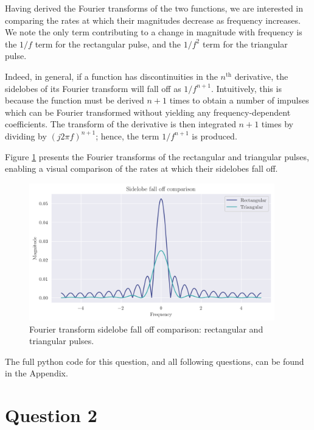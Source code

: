 \documentclass[a4paper, 11pt]{article}
\begin{document}
Having derived the Fourier transforms of the two functions, we are interested in
comparing the rates at which their magnitudes decrease as frequency increases.
We note the only term contributing to a change in magnitude with frequency is
the $1/f$ term for the rectangular pulse, and the $1/f^2$ term for the
triangular pulse.

Indeed, in general, if a function has discontinuities in the $n^\text{th}$
derivative, the sidelobes of its Fourier transform will fall off as $1/f^{n+1}$.
Intuitively, this is because the function must be derived $n+1$ times to obtain
a number of impulses which can be Fourier transformed without yielding any
frequency-dependent coefficients. The transform of the derivative is then
integrated $n+1$ times by dividing by $(j2\pi f)^{n+1}$; hence, the term
$1/f^{n+1}$ is produced.

\newpage

Figure \ref{fig:q1_sidelobes} presents the Fourier transforms of the rectangular
and triangular pulses, enabling a visual comparison of the rates at which their
sidelobes fall off.

\begin{figure}[ht]
    \centering
    \includegraphics[width=0.95\textwidth]{images/q1_sidelobes.png}
    \caption{Fourier transform sidelobe fall off comparison: rectangular and
             triangular pulses.}
    \label{fig:q1_sidelobes}
\end{figure}

The full python code for this question, and all following questions, can be
found in the Appendix.

\newpage
\section*{Question 2}
\end{document}
